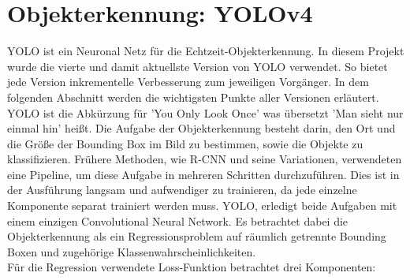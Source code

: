 \documentclass[conference]{IEEEtran}
\begin{document}
	\section{Objekterkennung: YOLOv4}
	YOLO \cite{b1} ist ein Neuronal Netz für die Echtzeit-Objekterkennung. In diesem Projekt wurde die vierte und damit aktuellste Version von YOLO \cite{b2} verwendet. So bietet jede Version inkrementelle Verbesserung zum jeweiligen Vorgänger. In dem folgenden Abschnitt werden die wichtigsten Punkte aller Versionen erläutert.\\
	YOLO ist die Abkürzung für 'You Only Look Once' was übersetzt 'Man sieht nur einmal hin' heißt. Die Aufgabe der Objekterkennung besteht darin, den Ort und die Größe der Bounding Box im Bild zu bestimmen, sowie die Objekte zu klassifizieren. Frühere Methoden, wie R-CNN \cite{rcnn} und seine Variationen, verwendeten eine Pipeline, um diese Aufgabe in mehreren Schritten durchzuführen. Dies ist in der Ausführung langsam und aufwendiger zu trainieren, da jede einzelne Komponente separat trainiert werden muss. YOLO, erledigt beide Aufgaben mit einem einzigen Convolutional Neural Network. Es betrachtet dabei die Objekterkennung als ein Regressionsproblem auf räumlich getrennte Bounding Boxen und zugehörige Klassenwahrscheinlichkeiten.\\
	Für die Regression verwendete Loss-Funktion betrachtet drei Komponenten:
\end{document}
